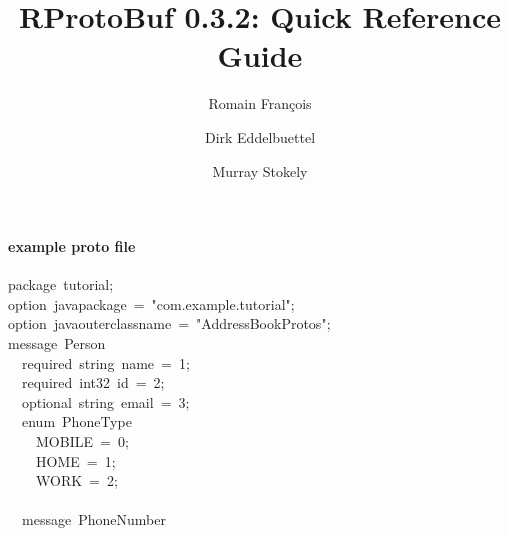 \documentclass[10pt,twocolumn,a4paper]{article}
\author{Romain Fran\c{c}ois \and Dirk Eddelbuettel \and Murray Stokely}
\title{RProtoBuf 0.3.2: Quick Reference Guide}
\newenvironment{Houtput}%
{}%
{}%
\newcommand{\hlstd}[1]{\textcolor[rgb]{0,0,0}{#1}}%
\begin{document}
\maketitle
\thispagestyle{empty}

\paragraph{example proto file}

\begin{Houtput}

\ttfamily\noindent
package{\ }tutorial;\hspace*{\fill}\\
\hlstd{}option{\ }java\usebox{\hlnormalsizeboxunderscore}package{\ }={\ }"{}com.example.tutorial"{};\hspace*{\fill}\\
\hlstd{}option{\ }java\usebox{\hlnormalsizeboxunderscore}outer\usebox{\hlnormalsizeboxunderscore}classname{\ }={\ }"{}AddressBookProtos"{};\hspace*{\fill}\\
\hlstd{}message{\ }Person{\ }\usebox{\hlnormalsizeboxopenbrace}\hspace*{\fill}\\
\hlstd{}{\ }{\ }required{\ }string{\ }name{\ }={\ }1;\hspace*{\fill}\\
\hlstd{}{\ }{\ }required{\ }int32{\ }id{\ }={\ }2;{\ }{\ }{\ }{\ }{\ }{\ }{\ }{\ }\hspace*{\fill}\\
\hlstd{}{\ }{\ }optional{\ }string{\ }email{\ }={\ }3;\hspace*{\fill}\\
\hlstd{}{\ }{\ }enum{\ }PhoneType{\ }\usebox{\hlnormalsizeboxopenbrace}\hspace*{\fill}\\
\hlstd{}{\ }{\ }{\ }{\ }MOBILE{\ }={\ }0;\hspace*{\fill}\\
\hlstd{}{\ }{\ }{\ }{\ }HOME{\ }={\ }1;\hspace*{\fill}\\
\hlstd{}{\ }{\ }{\ }{\ }WORK{\ }={\ }2;\hspace*{\fill}\\
\hlstd{}{\ }{\ }\usebox{\hlnormalsizeboxclosebrace}\hspace*{\fill}\\
\hlstd{}{\ }{\ }message{\ }PhoneNumber{\ }\usebox{\hlnormalsizeboxopenbrace}\hspace*{\fill}\\

\end{Houtput}
\end{document}
